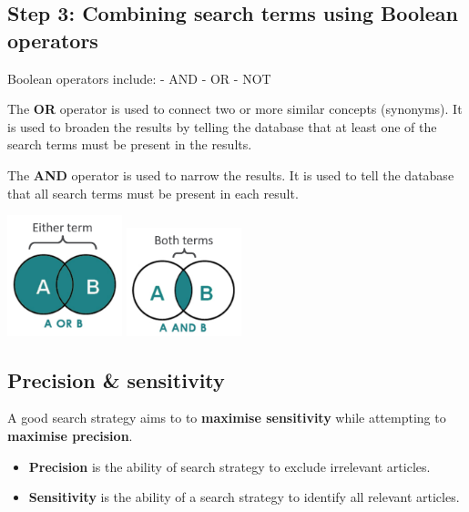 \documentclass[
]{book}
\providecommand{\tightlist}{%
  \setlength{\itemsep}{0pt}\setlength{\parskip}{0pt}}
\begin{document}
\hypertarget{step-3-combining-search-terms-using-boolean-operators}{%
\subsection{Step 3: Combining search terms using Boolean operators}\label{step-3-combining-search-terms-using-boolean-operators}}

Boolean operators include:
- AND
- OR
- NOT

The \textbf{OR} operator is used to connect two or more similar concepts (synonyms). It is used to broaden the results by telling the database that at least one of the search terms must be present in the results.

The \textbf{AND} operator is used to narrow the results. It is used to tell the database that all search terms must be present in each result.

\includegraphics[width=0.25\textwidth,height=0.25\textheight]{figs/booleanOR.png}
\includegraphics[width=0.25\textwidth,height=0.25\textheight]{figs/booleanAND.png}

\hypertarget{precision-sensitivity}{%
\subsection{Precision \& sensitivity}\label{precision-sensitivity}}

A good search strategy aims to to \textbf{maximise sensitivity} while attempting to \textbf{maximise precision}.

\begin{itemize}
\tightlist
\item
  \textbf{Precision} is the ability of search strategy to exclude irrelevant articles.
\item
  \textbf{Sensitivity} is the ability of a search strategy to identify all relevant articles.
\end{itemize}
\end{document}
